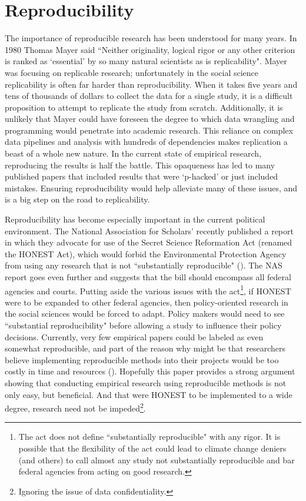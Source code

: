 \documentclass[12pt]{article}
\begin{document}
\section{Reproducibility}
The importance of reproducible research has been understood for many years. In 1980 Thomas Mayer said ``Neither originality, logical rigor or any other criterion is ranked as `essential' by so many natural scientists as is replicability". Mayer was focusing on replicable research; unfortunately in the social science replicability is often far harder than reproducibility. When it takes five years and tens of thousands of dollars to collect the data for a single study, it is a difficult proposition to attempt to replicate the study from scratch. Additionally, it is unlikely that Mayer could have foreseen the degree to which data wrangling and programming would penetrate into academic research. This reliance on complex data pipelines and analysis with hundreds of dependencies makes replication a beast of a whole new nature. In the current state of empirical research, reproducing the results is half the battle. This opaqueness has led to many published papers that included results that were `p-hacked' or just included mistakes. Ensuring reproducibility would help alleviate many of these issues, and is a big step on the road to replicability.

Reproducibility has become especially important in the current political environment. The National Association for Scholars' recently published a report in which they advocate for use of the Secret Science Reformation Act (renamed the HONEST Act), which would forbid the Environmental Protection Agency from using any research that is not ``substantially reproducible" (\cite{wired}). The NAS report goes even further and suggests that the bill should encompass all federal agencies and courts. Putting aside the various issues with the act\footnote{The act does not define ``substantially reproducible" with any rigor. It is possible that the flexibility of the act could lead to climate change deniers (and others) to call almost any study not substantially reproducible and bar federal agencies from acting on good research.}, if HONEST were to be expanded to other federal agencies, then policy-oriented research in the social sciences would be forced to adapt. Policy makers would need to see ``substantial reproducibility" before allowing a study to influence their policy decisions. Currently, very few empirical papers could be labeled as even somewhat reproducible, and part of the reason why might be that researchers believe implementing reproducible methods into their projects would be too costly in time and resources (\cite{irreproducible}). Hopefully this paper provides a strong argument showing that conducting empirical research using reproducible methods is not only easy, but beneficial. And that were HONEST to be implemented to a wide degree, research need not be impeded\footnote{Ignoring the issue of data confidentiality.}.
\end{document}
